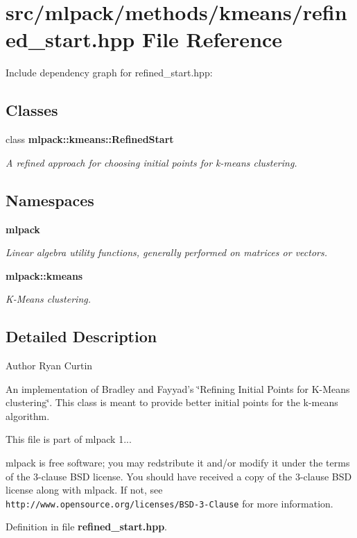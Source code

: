 \section{src/mlpack/methods/kmeans/refined\-\_\-start.hpp File Reference}
\label{refined__start_8hpp}
Include dependency graph for refined\-\_\-start.\-hpp\-:
\subsection*{Classes}
\begin{DoxyCompactItemize}
\item 
class {\bf mlpack\-::kmeans\-::\-Refined\-Start}
\begin{DoxyCompactList}\small\item\em A refined approach for choosing initial points for k-\/means clustering. \end{DoxyCompactList}\end{DoxyCompactItemize}
\subsection*{Namespaces}
\begin{DoxyCompactItemize}
\item 
{\bf mlpack}
\begin{DoxyCompactList}\small\item\em Linear algebra utility functions, generally performed on matrices or vectors. \end{DoxyCompactList}\item 
{\bf mlpack\-::kmeans}
\begin{DoxyCompactList}\small\item\em K-\/\-Means clustering. \end{DoxyCompactList}\end{DoxyCompactItemize}


\subsection{Detailed Description}
\begin{DoxyAuthor}{Author}
Ryan Curtin
\end{DoxyAuthor}
An implementation of Bradley and Fayyad's \char`\"{}\-Refining Initial Points for
\-K-\/\-Means clustering\char`\"{}. This class is meant to provide better initial points for the k-\/means algorithm.

This file is part of mlpack 1...

mlpack is free software; you may redstribute it and/or modify it under the terms of the 3-\/clause B\-S\-D license. You should have received a copy of the 3-\/clause B\-S\-D license along with mlpack. If not, see {\tt http\-://www.\-opensource.\-org/licenses/\-B\-S\-D-\/3-\/\-Clause} for more information. 

Definition in file {\bf refined\-\_\-start.\-hpp}.

